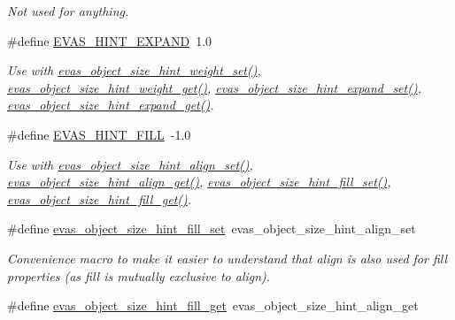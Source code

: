 \begin{DoxyCompactItemize}
\begin{DoxyCompactList}\small\item\em Not used for anything. \item\end{DoxyCompactList}\item 
\#define \hyperlink{Evas_8h_aa47c85083d3dae0111c21ec49359306a}{EVAS\_\-HINT\_\-EXPAND}~1.0\label{Evas_8h_aa47c85083d3dae0111c21ec49359306a}

\begin{DoxyCompactList}\small\item\em Use with \hyperlink{group__Evas__Object__Group__Size__Hints_gabb010d4e7a8772b1785185d89a1a6b98}{evas\_\-object\_\-size\_\-hint\_\-weight\_\-set()}, \hyperlink{group__Evas__Object__Group__Size__Hints_ga66f88dc981e7c0af05822c583e03fabb}{evas\_\-object\_\-size\_\-hint\_\-weight\_\-get()}, \hyperlink{Evas_8h_ab239e77a0e38a5a756acbb0604055ecf}{evas\_\-object\_\-size\_\-hint\_\-expand\_\-set()}, \hyperlink{Evas_8h_a71adf20af9358d9d26b7c88b61d1fc8d}{evas\_\-object\_\-size\_\-hint\_\-expand\_\-get()}. \item\end{DoxyCompactList}\item 
\#define \hyperlink{Evas_8h_aecbac710f36d52911fc34dcdaf8e729c}{EVAS\_\-HINT\_\-FILL}~-\/1.0\label{Evas_8h_aecbac710f36d52911fc34dcdaf8e729c}

\begin{DoxyCompactList}\small\item\em Use with \hyperlink{group__Evas__Object__Group__Size__Hints_ga156cf1921d0be0d7dcf4d6f93daf010f}{evas\_\-object\_\-size\_\-hint\_\-align\_\-set()}, \hyperlink{group__Evas__Object__Group__Size__Hints_gaff2802d3169b29a786f9b39be3f474bb}{evas\_\-object\_\-size\_\-hint\_\-align\_\-get()}, \hyperlink{Evas_8h_a1b148ef14ae2eb1fbde17179b66a0503}{evas\_\-object\_\-size\_\-hint\_\-fill\_\-set()}, \hyperlink{Evas_8h_ac787ce1277b96bed04ff2b08449907c9}{evas\_\-object\_\-size\_\-hint\_\-fill\_\-get()}. \item\end{DoxyCompactList}\item 
\#define \hyperlink{Evas_8h_a1b148ef14ae2eb1fbde17179b66a0503}{evas\_\-object\_\-size\_\-hint\_\-fill\_\-set}~evas\_\-object\_\-size\_\-hint\_\-align\_\-set\label{Evas_8h_a1b148ef14ae2eb1fbde17179b66a0503}

\begin{DoxyCompactList}\small\item\em Convenience macro to make it easier to understand that align is also used for fill properties (as fill is mutually exclusive to align). \item\end{DoxyCompactList}\item 
\#define \hyperlink{Evas_8h_ac787ce1277b96bed04ff2b08449907c9}{evas\_\-object\_\-size\_\-hint\_\-fill\_\-get}~evas\_\-object\_\-size\_\-hint\_\-align\_\-get\label{Evas_8h_ac787ce1277b96bed04ff2b08449907c9}


\end{DoxyCompactItemize}
